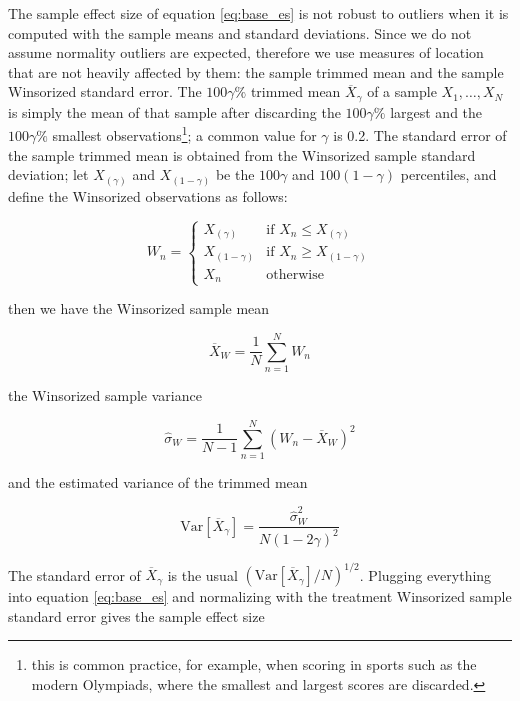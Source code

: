 \documentclass[a4paper]{book}
\begin{document}
The sample effect size of equation \ref{eq:base_es} is not robust to outliers when it is computed with the sample means and standard deviations. Since we do not assume normality outliers are expected, therefore we use measures of location that are not heavily affected by them: the sample trimmed mean and the sample Winsorized standard error. The $100\gamma \%$ trimmed mean $\overline{X}_\gamma$ of a sample $X_1,\ldots,X_N$ is simply the mean of that sample after discarding the $100\gamma\%$ largest and the $100\gamma\%$ smallest observations\footnote{this is common practice, for example, when scoring in sports such as the modern Olympiads, where the smallest and largest scores are discarded.}; a common value for $\gamma$ is 0.2. The standard error of the sample trimmed mean is obtained from the Winsorized sample standard deviation; let $X_{(\gamma)}$ and $X_{(1-\gamma)}$ be the $100\gamma$ and $100(1-\gamma)$ percentiles, and define the Winsorized observations as follows:

\begin{equation}
W_n=\begin{cases}
X_{(\gamma)} & \text{if }X_n\leq X_{(\gamma)} \\
X_{(1-\gamma)} & \text{if }X_n\geq X_{(1-\gamma)} \\
X_n &\text{otherwise}
\end{cases}
\end{equation}

\noindent then we have the Winsorized sample mean

\begin{equation}
\overline{X}_W=\frac{1}{N}\sum_{n=1}^N W_n
\end{equation}

\noindent the Winsorized sample variance

\begin{equation}
\hat{\sigma}_W=\frac{1}{N-1}\sum_{n=1}^N (W_n-\overline{X}_W)^2
\end{equation}

\noindent and the estimated variance of the trimmed mean

\begin{equation}
\text{Var}[\overline{X}_\gamma]=\frac{\hat{\sigma}^2_W}{N(1-2\gamma)^2}
\end{equation}

The standard error of $\overline{X}_\gamma$ is the usual $(\text{Var}[\overline{X}_\gamma]/N)^{1/2}$. Plugging everything into equation \ref{eq:base_es} and normalizing with the treatment Winsorized sample standard error gives the sample effect size
\end{document}
